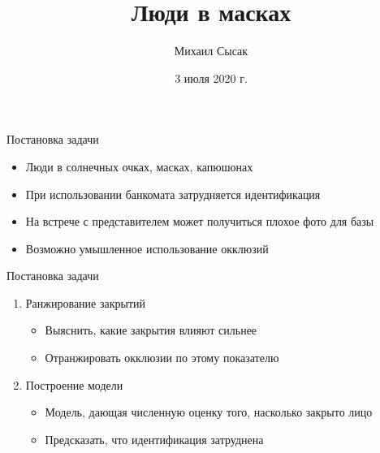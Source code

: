 \documentclass{beamer}
\title{Люди в масках}
\author{Михаил Сысак}
\institute{Лаборатория финансовых технологий, МФТИ}
\date{3 июля 2020 г.}
\begin{document}
\setlength{\abovecaptionskip}{-2pt}
\setlength{\belowcaptionskip}{6pt}
\maketitle


\begin{frame}{Постановка задачи}
\begin{itemize}
    \item Люди в солнечных очках, масках, капюшонах
    \item При использовании банкомата затрудняется идентификация
    \item На встрече с представителем может получиться плохое фото для базы
    \item Возможно умышленное использование окклюзий
\end{itemize}
\end{frame}


\begin{frame}{Постановка задачи}
    \begin{enumerate}
        \item Ранжирование закрытий
        \begin{itemize}
            \item Выяснить, какие закрытия влияют сильнее 
            \item Отранжировать окклюзии по этому показателю
        \end{itemize}
        \item Построение модели
        \begin{itemize}
            \item Модель, дающая численную оценку того, насколько закрыто лицо
            \item Предсказать, что идентификация затруднена
        \end{itemize}
    \end{enumerate}
\end{frame}

\end{document}
